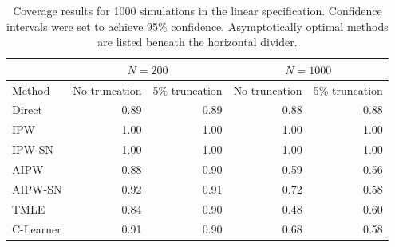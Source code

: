 \begin{table}[H]
\centering
\small
\begin{tabular}{lrrrr}
\toprule
  & \multicolumn{2}{c}{$N=200$} & \multicolumn{2}{c}{$N=1000$} \\
  \midrule 
  Method & No truncation & 5\% truncation & No truncation & 5\% truncation \\ 
  \midrule
  Direct & 0.89 & 0.89 & 0.88 & 0.88 \\ 
  IPW & 1.00 & 1.00 & 1.00 & 1.00 \\ 
  IPW-SN & 1.00 & 1.00 & 1.00 & 1.00 \\ 
  \greymidrule
  AIPW & 0.88 & 0.90 & 0.59 & 0.56 \\ 
  AIPW-SN & 0.92 & 0.91 & 0.72 & 0.58 \\  
  TMLE & 0.84 & 0.90 & 0.48 & 0.60 \\ 
  C-Learner & 0.91 & 0.90 & 0.68 & 0.58 \\ 
\bottomrule
\end{tabular}
\caption{Coverage results for 1000 simulations in the linear specification. Confidence intervals were set to achieve 95\% confidence. Asymptotically optimal methods are listed beneath the horizontal divider.}
\label{tb:coverage_ks}
\end{table}

